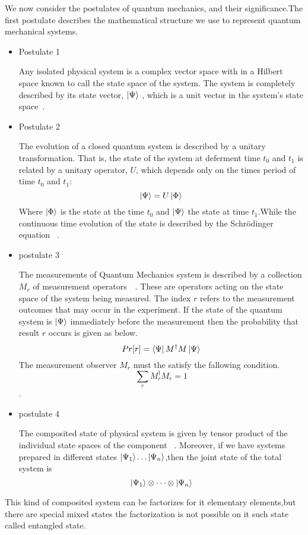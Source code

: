 We now consider the postulates of quantum mechanics, and their significance.The first postulate describes the mathematical structure we use to represent quantum mechanical systems.
\begin{itemize}
\item {Postulate 1}

Any isolated physical system is a complex vector space with in a Hilbert space known to call the state space of the system. The system is completely described by its state vector, $\ket{\Psi}$ , which is a unit vector in the system’s state space~\cite{book:17312}.
\item{Postulate 2}

The evolution of a closed quantum system is described by a unitary transformation. That is, the state of the system at deferment time $t_0$ and $t_1$ is related  by a unitary operator, $U$, which depends only on the times period of time $t_0$ and $t_1$:
$$\ket{\Psi}=U\ket{\Phi}$$
Where $\ket{\Phi}$ is the state at the time $t_0$ and $\ket{\Psi}$ the state at time $t_1$.While the continuous time evolution  of the state is described by the Schrödinger equation ~\cite{book:17312}.
\item{postulate 3}

The measurements of Quantum Mechanics system  is described by a collection ${M_r }$ of measurement operators~\citep{book:17312}~. These are operators acting on the state space of the system being
measured. The index $r $ refers to the measurement outcomes that may occur in the experiment. If the state of the quantum system is $\ket{\Psi}$ immediately before the measurement then the probability that result $r$ occurs is given as below.
$$Pr[r]=\bra{\Psi}M^{\dagger}  M\ket{\Psi}$$ 
The measurement observer ${M_r }$ must the satisfy the fallowing condition.
$$\sum_r M_{r}^{\dagger} M_r=1$$.


\item{postulate 4}

The composited state of physical system is given by  tensor product of the individual state spaces of the component~\citep{book:889079} . Moreover, if we have systems prepared  in different  states $\ket{\Psi_1} \dots \ket{\Psi_n}$,then the joint state of the total system is
$$\ket{\Psi_1}\otimes\dots \otimes\ket{\Psi_n}$$
\end{itemize}
This kind of composited system can be factorizes for it elementary elements,but there are special mixed states the factorization is not possible  on it such state called entangled state.
